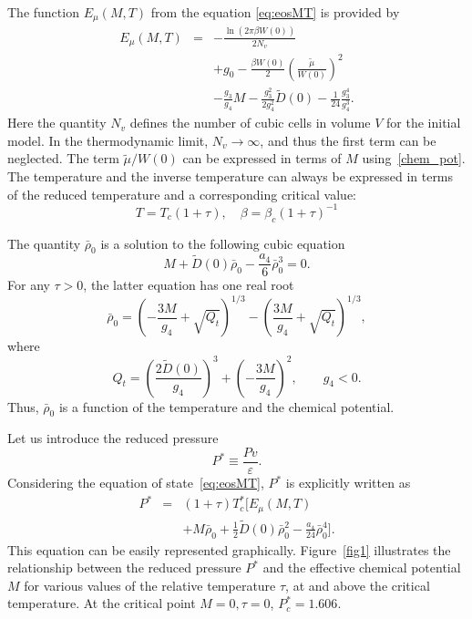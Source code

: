 The function $E_\mu(M, T)$ from the equation \eqref{eq:eosMT} is provided by
\begin{eqnarray}\label{eq:E_mu}
	E_\mu (M, T) & = & - \frac{\ln (2\pi \beta W(0))}{2 N_v}  
	\nonumber\\
	&& +  g_0 - \frac{\beta W(0)}{2} 
	\left(\frac{\tilde\mu}{W(0)} \right)^{2} 
	\nonumber\\
	&& - \frac{g_3}{g_4} {M} \! - \frac{g_3^2}{2 g_4^2}  \tilde D(0) - \frac{1}{24} \frac{g_3^4}{g_4^3}. 
\end{eqnarray}
Here the quantity $N_v$ defines the number of cubic cells in volume $V$ for the initial model.
In the thermodynamic limit, $N_v \to \infty$, and thus the first term can be neglected. The term $\tilde{\mu}/W(0)$ can be expressed in terms of $M$ using~\eqref{chem_pot}. The temperature and the inverse temperature can always be expressed in terms of the reduced temperature and a corresponding critical value:
\begin{equation*}
	T = T_c(1+\tau), \quad \beta = \beta_c (1 + \tau)^{-1}
\end{equation*} 

The quantity $\bar{\rho}_0$ is a solution to the following cubic equation
\begin{equation}\label{eq:ro_M}
	M + \tilde D(0) \bar\rho_0 - \frac{a_4}{6} \bar\rho_0^3 = 0.
\end{equation}
For any $\tau > 0$, the latter equation has one real root
\begin{equation}\label{eq:ro_MT}
	\bar \rho_0 = \left(- \frac{3 M}{g_4} + \sqrt{Q_t}\right)^{1/3} - \left(  \frac{3 M}{g_4} + \sqrt{Q_t} \right)^{1/3},
\end{equation}
where
\begin{equation}
	Q_t = \left(  \frac{2\tilde D(0)}{g_4}\right)^3 + \left( -\frac{3 M}{g_4}\right)^2, \qquad g_4<0.
\end{equation}
Thus, $\bar{\rho}_0$ is a function of the temperature and the chemical potential.

Let us introduce the reduced pressure
\begin{equation}
	\label{def:reduced_pres}
	P^* \equiv \frac{P v}{\varepsilon}.
\end{equation}
Considering the equation of state~\eqref{eq:eosMT}, $P^*$ is explicitly written as
\begin{eqnarray}
	\label{eq:eosPTM_reduced}
	P^* & = & (1 + \tau)T^*_c \bigg[ E_\mu(M, T) 
	\nonumber\\
	&& + M \bar \rho_0 + \frac{1}{2} \tilde D(0) \bar \rho_0^2 - \frac{a_4}{24} \bar \rho_0^4
	\bigg].
\end{eqnarray}
This equation can be easily represented graphically. Figure~\ref{fig1} illustrates the relationship between the reduced pressure $P^*$ and the effective chemical potential $M$ for various values of the relative temperature $\tau$, at and above the critical temperature. At the critical point $M=0, \tau=0$, $P^*_c = 1.606$. 


